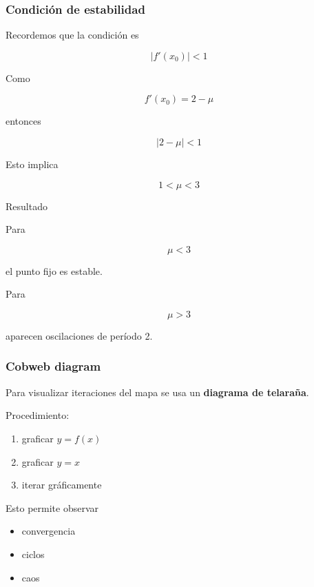 \begin{frame}
\footnotesize
\frametitle{Condición de estabilidad}

Recordemos que la condición es

\[
|f'(x_0)|<1
\]

Como

\[
f'(x_0)=2-\mu
\]

entonces

\[
|2-\mu|<1
\]

Esto implica

\[
1<\mu<3
\]

\begin{block}{Resultado}

Para

\[
\mu<3
\]

el punto fijo es estable.

Para

\[
\mu>3
\]

aparecen oscilaciones de período 2.

\end{block}

\end{frame}


\begin{frame}
\frametitle{Cobweb diagram}

Para visualizar iteraciones del mapa se usa
un \textbf{diagrama de telaraña}.

Procedimiento:

\begin{enumerate}
\item graficar $y=f(x)$
\item graficar $y=x$
\item iterar gráficamente
\end{enumerate}

Esto permite observar

\begin{itemize}
\item convergencia
\item ciclos
\item caos
\end{itemize}

\end{frame}


